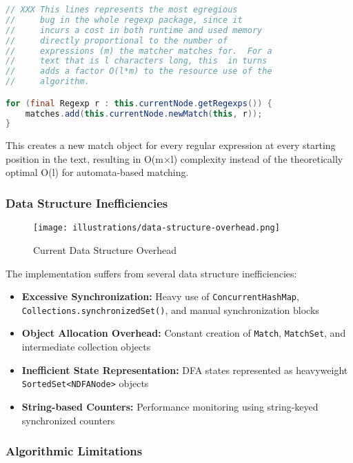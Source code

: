 \documentclass[11pt,a4paper]{article}
\begin{document}
\begin{lstlisting}[language=Java,caption=Critical bottleneck in MatchSetImpl]
// XXX This lines represents the most egregious
//     bug in the whole regexp package, since it
//     incurs a cost in both runtime and used memory
//     directly proportional to the number of
//     expressions (m) the matcher matches for.  For a
//     text that is l characters long, this  in turns
//     adds a factor O(l*m) to the resource use of the
//     algorithm.

for (final Regexp r : this.currentNode.getRegexps()) {
    matches.add(this.currentNode.newMatch(this, r));
}
\end{lstlisting}

This creates a new match object for every regular expression at every starting position in the text, resulting in O(m×l) complexity instead of the theoretically optimal O(l) for automata-based matching.

\subsubsection{Data Structure Inefficiencies}

\begin{figure}[htbp]
\centering
\texttt{[image: illustrations/data-structure-overhead.png]}
\caption{Current Data Structure Overhead}
\label{fig:data-overhead}
\end{figure}

The implementation suffers from several data structure inefficiencies:

\begin{itemize}
\item \textbf{Excessive Synchronization:} Heavy use of \texttt{ConcurrentHashMap}, \texttt{Collections.synchronizedSet()}, and manual synchronization blocks
\item \textbf{Object Allocation Overhead:} Constant creation of \texttt{Match}, \texttt{MatchSet}, and intermediate collection objects
\item \textbf{Inefficient State Representation:} DFA states represented as heavyweight \texttt{SortedSet<NDFANode>} objects
\item \textbf{String-based Counters:} Performance monitoring using string-keyed synchronized counters
\end{itemize}

\subsubsection{Algorithmic Limitations}
\end{document}

